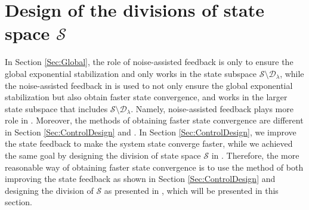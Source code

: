 \documentclass[]{elsarticle}
\begin{document}
\section{Design of the divisions of state space $\mathcal{S}$}\label{Sec:Optimization_of_division}
In Section \ref{Sec:Global}, the role of noise-assisted feedback is only to ensure the global exponential stabilization and only works in the state subspace $\mathcal{S}\setminus \mathcal{D}_\lambda$, while the noise-assisted feedback in \cite{WSJZJ2021c} is used to not only ensure the global exponential stabilization but also obtain faster state convergence, and works in the larger state subspace that includes $\mathcal{S}\setminus \mathcal{D}_\lambda$. Namely, noise-assisted feedback plays more role in \cite{WSJZJ2021c}. Moreover, the methods of obtaining faster state convergence are different in Section \ref{Sec:ControlDesign} and \cite{WSJZJ2021c}. In Section \ref{Sec:ControlDesign}, we improve the state feedback to make the system state converge faster, while we achieved the same goal by designing the division of state space  $\mathcal{S}$ in \cite{WSJZJ2021c}. Therefore, the more reasonable way of obtaining faster state convergence is to use the method of both improving the state feedback as shown in Section \ref{Sec:ControlDesign} and designing the division of $\mathcal{S}$ as presented in \cite{WSJZJ2021c}, which will be presented in this section.
\end{document}
